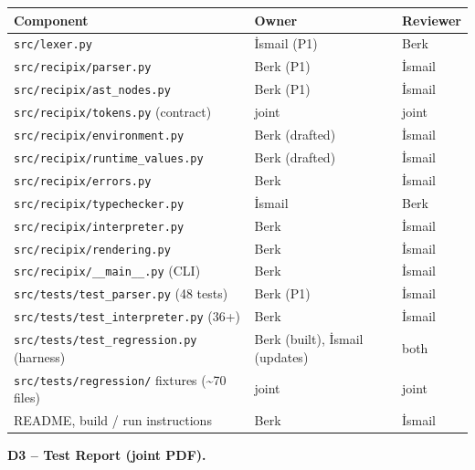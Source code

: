 \documentclass[11pt,a4paper]{article}
\begin{document}
\begin{center}
\small
\begin{tabular}{@{}p{}p{}p{}@{}}
\toprule
\textbf{Component} & \textbf{Owner} & \textbf{Reviewer} \\
\midrule
\texttt{src/lexer.py}                            & İsmail (P1)       & Berk   \\
\texttt{src/recipix/parser.py}                   & Berk (P1)         & İsmail \\
\texttt{src/recipix/ast\_nodes.py}               & Berk (P1)         & İsmail \\
\texttt{src/recipix/tokens.py} (contract)        & joint             & joint  \\
\texttt{src/recipix/environment.py}              & Berk (drafted)    & İsmail \\
\texttt{src/recipix/runtime\_values.py}          & Berk (drafted)    & İsmail \\
\texttt{src/recipix/errors.py}                   & Berk              & İsmail \\
\texttt{src/recipix/typechecker.py}              & İsmail            & Berk   \\
\texttt{src/recipix/interpreter.py}              & Berk              & İsmail \\
\texttt{src/recipix/rendering.py}                & Berk              & İsmail \\
\texttt{src/recipix/\_\_main\_\_.py} (CLI)       & Berk              & İsmail \\
\texttt{src/tests/test\_parser.py} (48 tests)    & Berk (P1)         & İsmail \\
\texttt{src/tests/test\_interpreter.py} (36+)    & Berk              & İsmail \\
\texttt{src/tests/test\_regression.py} (harness) & Berk (built), İsmail (updates) & both \\
\texttt{src/tests/regression/} fixtures (\textasciitilde 70 files) & joint & joint \\
README, build / run instructions                 & Berk              & İsmail \\
\bottomrule
\end{tabular}
\end{center}

\noindent\textbf{D3 -- Test Report (joint PDF).}
\end{document}
